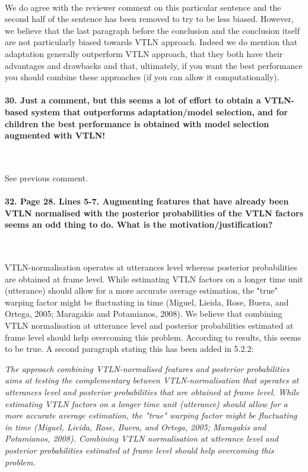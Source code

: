 \documentclass[]{article}
\begin{document}
~

We do agree with the reviewer comment on this particular sentence and the second half of the sentence has been removed to try to be less biased. However, we believe that the last paragraph before the conclusion and the conclusion itself are not particularly biased towards VTLN approach. Indeed we do mention that adaptation generally outperform VTLN approach, that they both have their advantages and drawbacks and that, ultimately, if you want the best performance you should combine these approaches (if you can allow it computationally).

\paragraph{30. Just a comment, but this seems a lot of effort to obtain a VTLN-based system that outperforms adaptation/model selection, and for children the best performance is obtained with model selection augmented with VTLN!}

~

See previous comment.

\paragraph{32. Page 28. Lines 5-7. Augmenting features that have already been VTLN normalised with the posterior probabilities of the VTLN factors seems an odd thing to do. What is the motivation/justification?}

~

VTLN-normalisation operates at utterances level whereas posterior probabilities are obtained at frame level. While estimating VTLN factors on a longer time unit (utterance) should allow for a more accurate average estimation, the "true" warping factor might be fluctuating in time (Miguel, Lieida, Rose, Buera, and Ortega, 2005; Maragakis and Potamianos,
2008). We believe that combining VTLN normalisation at utterance level and posterior probabilities estimated at frame level should help overcoming this problem. According to results, this seems to be true. A second paragraph stating this has been added in 5.2.2:

\textit{The approach combining VTLN-normalised features and posterior probabilities aims at testing the complementary between VTLN-normalisation that operates at utterances level and posterior probabilities that are obtained at frame level. While estimating VTLN factors on a longer time unit (utterance) should allow for a more accurate average estimation, the "true" warping factor might be fluctuating in time (Miguel, Lieida, Rose, Buera, and Ortega, 2005; Maragakis and Potamianos,
2008). Combining VTLN normalisation at utterance level and posterior probabilities estimated at frame level should help overcoming this problem.}
\end{document}
